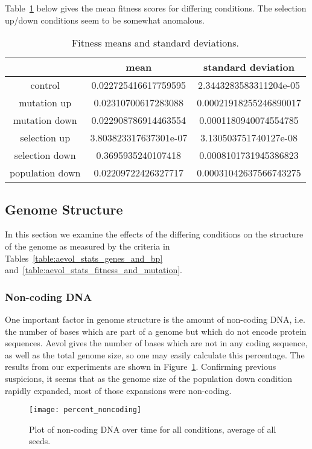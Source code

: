 Table~\ref{table:fitness_means_std_dev} below gives the mean fitness scores for differing conditions. The selection up/down conditions seem to be somewhat anomalous.
\begin{table}[H]
	\centering
	\begin{tabular}{|c||c|c|}
		\hline
		& \textbf{mean} & \textbf{standard deviation} \\
		\hline \hline
		control & 0.022725416617759595 & 2.3443283583311204e-05 \\
		\hline
		mutation up & 0.02310700617283088 & 0.00021918255246890017 \\
		\hline
		mutation down & 0.022908786914463554 & 0.0001180940074554785 \\
		\hline
		selection up & 3.803823317637301e-07 & 3.130503751740127e-08 \\
		\hline
		selection down & 0.3695935240107418	& 0.0008101731945386823 \\
		\hline
		population down & 0.02209722426327717 & 0.00031042637566743275 \\
		\hline
	\end{tabular}
	\caption[Fitness means and standard deviations.]{Fitness means and standard deviations. }
	\label{table:fitness_means_std_dev}
\end{table}

\subsection{Genome Structure}
In this section we examine the effects of the differing conditions on the structure of the genome as measured by the criteria in Tables~\ref{table:aevol_stats_genes_and_bp} and~\ref{table:aevol_stats_fitness_and_mutation}. 

\subsubsection{Non-coding DNA}
One important factor in genome structure is the amount of non-coding DNA, i.e. the number of bases which are part of a genome but which do not encode protein sequences. Aevol gives the number of bases which are not in any coding sequence, as well as the total genome size, so one may easily calculate this percentage. The results from our experiments are shown in Figure~\ref{fig:mean_non-coding_DNA}. Confirming previous suspicions, it seems that as the genome size of the population down condition rapidly expanded, most of those expansions were non-coding. 
\begin{figure}[H]
	\centering
	\texttt{[image: percent\_noncoding]}
	\caption[Non-coding DNA]{Plot of non-coding DNA over time for all conditions, average of all seeds.}
	\label{fig:mean_non-coding_DNA}
\end{figure}

